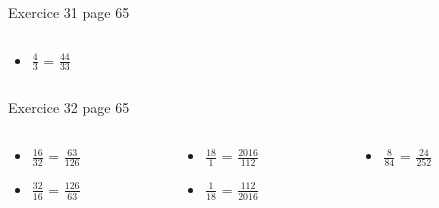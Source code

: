 \documentclass[xcolor={dvipsnames}]{beamer}
\begin{document}
\begin{frame}
\begin{block}{Exercice 31 page 65}
\begin{columns}
		\begin{column}{0.25\textwidth}
			\begin{huge}
				\begin{itemize}
					
					\item $\frac{4}{3}$ = \pause $\frac{44}{33}$\pause					
				\end{itemize}	
			\end{huge}
			
		\end{column}
	\end{columns}		
	
	\end{block}	


	\begin{block}{Exercice 32 page 65}
		\begin{columns}
			\begin{column}{0.25\textwidth}
				\begin{LARGE}
					\begin{itemize}
						\setlength\itemsep{1em}
						\item $\frac{16}{32}$ =  $\frac{63}{126}$ \pause
						
						\item $\frac{32}{16}$ =  $\frac{126}{63}$ \pause
						
						
					\end{itemize}	
				\end{LARGE}
				
			\end{column}
			
			\begin{column}{0.25\textwidth}
				\begin{LARGE}
					\begin{itemize}
						\setlength\itemsep{1em}
						\item $\frac{18}{1}$ = $\frac{2016}{112}$ 
						
						\item $\frac{1}{18}$ = $\frac{112}{2016}$ \pause
						
						
						
					\end{itemize}	
				\end{LARGE}
				
			\end{column}
			
			\begin{column}{0.25\textwidth}
				\begin{LARGE}
					\begin{itemize}
						\setlength\itemsep{1em}
						\item $\frac{8}{84}$ = $\frac{24}{252}$
						

\end{itemize}
\end{LARGE}
\end{column}
\end{columns}
\end{block}
\end{frame}
\end{document}
